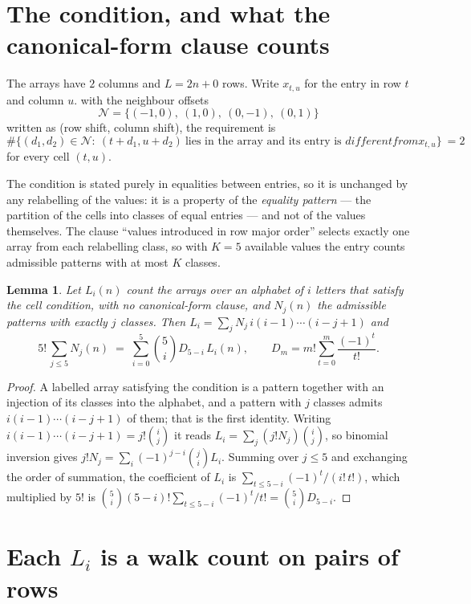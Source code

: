 \documentclass[11pt,a4paper]{article}
\theoremstyle{plain}
\newtheorem{lemma}[theorem]{Lemma}
\theoremstyle{definition}
\begin{document}
\section{The condition, and what the canonical-form clause counts}

The arrays have $2$ columns and $L=2n+0$ rows. Write $x_{t,u}$ for the entry in
row $t$ and column $u$. with the neighbour offsets
\[
\mathcal N=\{(-1,0),\ (1,0),\ (0,-1),\ (0,1)\}
\]
written as (row shift, column shift), the requirement is
\begin{equation}\label{eq:loc}
\#\bigl\{(d_1,d_2)\in\mathcal N:\ (t+d_1,u+d_2)\ \text{lies in the array and its entry is }
different from x_{t,u}\bigr\}\ =2
\end{equation}
for every cell $(t,u)$.

The condition is stated purely in equalities between entries, so it is unchanged by any
relabelling of the values: it is a property of the \emph{equality pattern} --- the partition
of the cells into classes of equal entries --- and not of the values themselves. The clause
``values introduced in row major order'' selects exactly one array from each relabelling
class, so with $K=5$ available values the entry counts admissible patterns with at most $K$
classes.

\begin{lemma}\label{lem:inv}
Let $L_i(n)$ count the arrays over an alphabet of $i$ letters that satisfy the cell
condition, with no canonical-form clause, and $N_j(n)$ the admissible patterns with exactly
$j$ classes. Then $L_i=\sum_j N_j\,i(i-1)\cdots(i-j+1)$ and
\[
5!\,\sum_{j\le 5}N_j(n)\;=\;\sum_{i=0}^{5}\binom{5}{i}D_{5-i}\,L_i(n),
\qquad D_m=m!\sum_{t=0}^{m}\frac{(-1)^t}{t!} .
\]
\end{lemma}

\begin{proof}
A labelled array satisfying the condition is a pattern together with an injection of its
classes into the alphabet, and a pattern with $j$ classes admits $i(i-1)\cdots(i-j+1)$ of
them; that is the first identity. Writing $i(i-1)\cdots(i-j+1)=j!\binom{i}{j}$ it reads
$L_i=\sum_j(j!N_j)\binom{i}{j}$, so binomial inversion gives
$j!N_j=\sum_i(-1)^{j-i}\binom{j}{i}L_i$. Summing over $j\le5$ and exchanging the
order of summation, the coefficient of $L_i$ is
$\sum_{t\le5-i}(-1)^t/(i!\,t!)$, which multiplied by $5!$ is
$\binom{5}{i}(5-i)!\sum_{t\le5-i}(-1)^t/t!=\binom{5}{i}D_{5-i}$.
\end{proof}

\section{Each $L_i$ is a walk count on pairs of rows}
\end{document}
